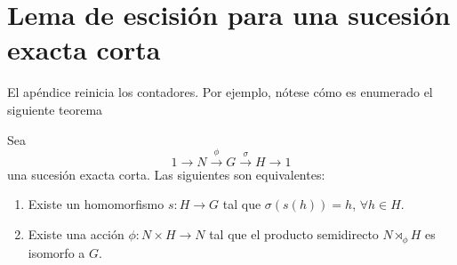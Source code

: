 \documentclass[11pt, twoside]{book}
\begin{document}
\chapter{Lema de escisión para una sucesión exacta corta}\label{apendice1}

El apéndice reinicia los contadores. Por ejemplo, nótese cómo es enumerado el
siguiente teorema

\begin{teorema} \label{separacion1}
  Sea
  \[1 \rightarrow N \xrightarrow{\phi} G\xrightarrow{\sigma} H \rightarrow 1\]
  una sucesión exacta corta. Las siguientes son equivalentes:
  \begin{enumerate}
  \item Existe un homomorfismo \(s:H \rightarrow G\) tal que \(\sigma(s(h)) = h
    \), \(\forall h \in H\).
  \item Existe una acción \(\phi:N \times H \rightarrow N\) tal que el
    producto semidirecto \(N \rtimes_{\phi} H\) es isomorfo a \(G\).
  \end{enumerate}
\end{teorema}
\end{document}
